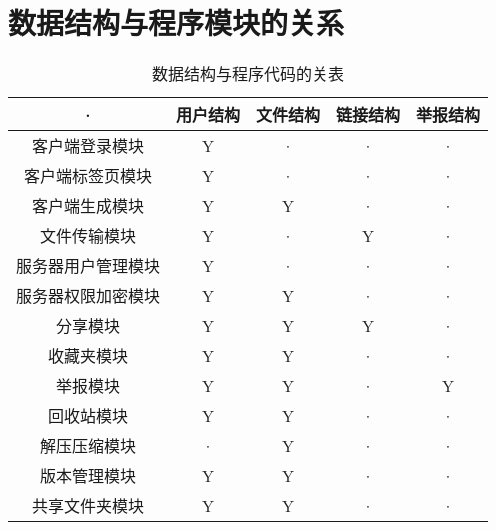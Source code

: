 \section{数据结构与程序模块的关系}
\begin{table}[htbp]
\centering
\caption{数据结构与程序代码的关表} \label{tab:datastructure-module}
\begin{tabular}{|c|c|c|c|c|}
    \hline
    · & 用户结构 & 文件结构 & 链接结构 & 举报结构\\
    \hline
    客户端登录模块 & Y & · & · & ·\\
    \hline
    客户端标签页模块 & Y & · & · & ·\\
    \hline
    客户端生成模块 & Y & Y & · & ·\\
    \hline
    文件传输模块 & Y & · & Y & ·\\
    \hline
    服务器用户管理模块 & Y & · & · & ·\\
    \hline
    服务器权限加密模块 & Y & Y & · & ·\\
    \hline
    分享模块 & Y & Y & Y & ·\\
    \hline
    收藏夹模块 & Y & Y & · & ·\\
    \hline
    举报模块 & Y & Y & · & Y\\
    \hline
    回收站模块  & Y & Y & · & ·\\
    \hline
    解压压缩模块  & · & Y & · & ·\\
    \hline
    版本管理模块  & Y & Y & · & ·\\
    \hline
    共享文件夹模块 & Y & Y & · & ·\\
    \hline
\end{tabular}
\end{table}